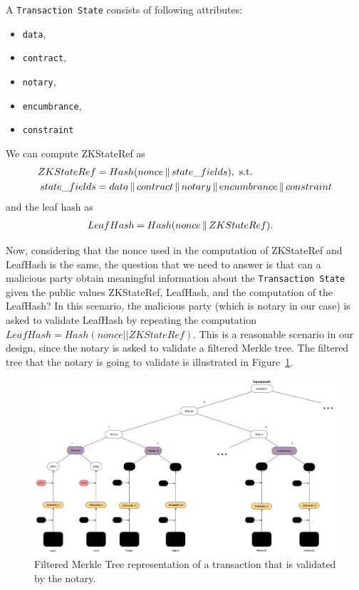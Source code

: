 A \texttt{Transaction State} consists of following attributes:
\begin{itemize}
\item \texttt{data},
\item \texttt{contract},
\item \texttt{notary},
\item \texttt{encumbrance},
\item \texttt{constraint}
\end{itemize}

We can compute ZKStateRef as
\begin{align}
ZKStateRef &= Hash(nonce \operatorname{\mathbin\Vert} state\_fields), \text{ s.t.} \\
state\_fields &= data \operatorname{\mathbin\Vert} contract \operatorname{\mathbin\Vert} notary \operatorname{\mathbin\Vert} encumbrance \operatorname{\mathbin\Vert} constraint \nonumber
\end{align}
\noindent and the leaf hash as
\begin{align}
LeafHash &= Hash(nonce \operatorname{\mathbin\Vert} ZKStateRef).
\end{align}

Now, considering that the nonce used in the computation of ZKStateRef and LeafHash is the same, the question that we need to answer is that can a malicious party obtain meaningful information about the \texttt{Transaction State} given the public values ZKStateRef, LeafHash, and the computation of the LeafHash?
In this scenario, the malicious party (which is notary in our case) is asked to validate LeafHash by repeating the computation $LeafHash = Hash(nonce || ZKStateRef)$.
This is a reasonable scenario in our design, since the notary is asked to validate a filtered Merkle tree.
The filtered tree that the notary is going to validate is illustrated in Figure~\ref{fig:filtered_tree_ts}.

\begin{figure}[ht]
\includegraphics[width=\textwidth]{Appendix1/images/filtered_tree_ts}
\caption{Filtered Merkle Tree representation of a transaction that is validated by the notary.}
\label{fig:filtered_tree_ts}
\end{figure}

